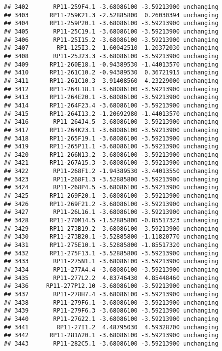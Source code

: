 \documentclass[]{article}
\begin{document}
\begin{verbatim}
## 3402       RP11-259F4.1 -3.68086100 -3.59213900 unchanging
## 3403      RP11-259K21.3 -2.52885800  0.26030394 unchanging
## 3404      RP11-259P20.1 -3.68086100 -3.59213900 unchanging
## 3405       RP11-25C19.1 -3.68086100 -3.59213900 unchanging
## 3406       RP11-25I15.2 -3.68086100 -3.59213900 unchanging
## 3407        RP1-125I3.2  1.60042510  1.20372030 unchanging
## 3408       RP11-25J23.3 -3.68086100 -3.59213900 unchanging
## 3409      RP11-260E18.1 -0.94389530 -1.44013570 unchanging
## 3410      RP11-261C10.2 -0.94389530  0.36721915 unchanging
## 3411      RP11-261C10.3  3.91408560  4.23229000 unchanging
## 3412      RP11-264E18.1 -3.68086100 -3.59213900 unchanging
## 3413      RP11-264E20.1 -3.68086100 -3.59213900 unchanging
## 3414      RP11-264F23.4 -3.68086100 -3.59213900 unchanging
## 3415      RP11-264I13.2 -1.20692980 -1.44013570 unchanging
## 3416       RP11-264J4.5 -3.68086100 -3.59213900 unchanging
## 3417      RP11-264K23.1 -3.68086100 -3.59213900 unchanging
## 3418      RP11-265F19.1 -3.68086100 -3.59213900 unchanging
## 3419      RP11-265P11.1 -3.68086100 -3.59213900 unchanging
## 3420      RP11-266N13.2 -3.68086100 -3.59213900 unchanging
## 3421      RP11-267A15.3 -3.68086100 -3.59213900 unchanging
## 3422       RP11-268F1.2 -1.94389530 -3.44013550 unchanging
## 3423       RP11-268F1.3 -3.52885800 -3.59213900 unchanging
## 3424       RP11-268P4.5 -3.68086100 -3.59213900 unchanging
## 3425      RP11-269F20.1 -3.68086100 -3.59213900 unchanging
## 3426      RP11-269F21.2 -3.68086100 -3.59213900 unchanging
## 3427       RP11-26L16.1 -3.68086100 -3.59213900 unchanging
## 3428      RP11-270M14.5 -1.52885800 -0.85517323 unchanging
## 3429      RP11-273B19.2 -3.68086100 -3.59213900 unchanging
## 3430      RP11-273B20.1 -3.52885800 -1.11820770 unchanging
## 3431      RP11-275E10.1 -3.52885800 -1.85517320 unchanging
## 3432      RP11-275F13.1 -3.52885800 -3.59213900 unchanging
## 3433       RP11-275N1.1 -3.68086100 -3.59213900 unchanging
## 3434       RP11-277A4.4 -3.68086100 -3.59213900 unchanging
## 3435       RP11-277L2.2  4.83746430  4.85448460 unchanging
## 3436     RP11-277P12.10 -3.68086100 -3.59213900 unchanging
## 3437       RP11-278H7.4 -3.68086100 -3.59213900 unchanging
## 3438       RP11-279F6.1 -3.68086100 -3.59213900 unchanging
## 3439       RP11-279F6.3 -3.68086100 -3.59213900 unchanging
## 3440       RP11-27G22.1 -3.68086100 -3.59213900 unchanging
## 3441        RP11-27I1.2  4.48795030  4.59328700 unchanging
## 3442      RP11-281A20.1 -3.68086100 -3.59213900 unchanging
## 3443       RP11-282C5.1 -3.68086100 -3.59213900 unchanging

\end{verbatim}
\end{document}
